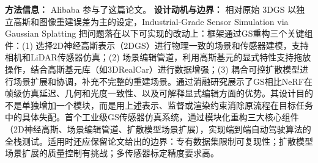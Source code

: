 \textbf{方法信息：} Alibaba 参与了这篇论文。
\textbf{设计动机与边界：} 相对原始 3DGS 以独立高斯和图像重建误差为主的设定，Industrial-Grade Sensor Simulation via Gaussian Splatting 把问题落在以下可实现的改动上：框架通过GS重构三个关键组件：(1) 选择2D神经高斯表示（2DGS）进行物理一致的场景和传感器建模，支持相机和LiDAR传感器仿真；(2) 场景编辑管道，利用高斯基元的显式特性支持拖放操作，结合高斯基元库（如3DRealCar）进行数据增强；(3) 耦合可控扩散模型进行场景扩展和协调，补充不完整的重建场景。通过消融研究展示了GS相比NeRF在帧级仿真延迟、几何和光度一致性、以及可解释显式编辑方面的优势。其设计目的不是单独增加一个模块，而是用上述表示、监督或渲染约束消除原流程在目标任务中的具体失配。首个工业级GS传感器仿真系统，通过模块化重构三大核心组件（2D神经高斯、场景编辑管道、扩散模型场景扩展），实现端到端自动驾驶算法的全栈测试。适用时还应保留论文给出的边界：专有数据集限制可复现性；扩散模型场景扩展的质量控制有挑战；多传感器标定精度要求高。

